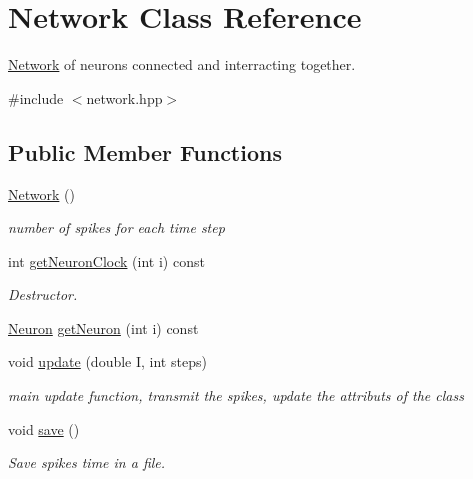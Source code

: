 \hypertarget{classNetwork}{\section{Network Class Reference}
\label{classNetwork}
}


\hyperlink{classNetwork}{Network} of neurons connected and interracting together.  




{\ttfamily \#include $<$network.\-hpp$>$}

\subsection*{Public Member Functions}
\begin{DoxyCompactItemize}
\item 
\hyperlink{classNetwork_a3cc2fb4f8fa4d507077e8da85ce5a1c8}{Network} ()
\begin{DoxyCompactList}\small\item\em number of spikes for each time step \end{DoxyCompactList}\item 
int \hyperlink{classNetwork_ad6a09c57e50ed597ba9d5579b3c60d81}{get\-Neuron\-Clock} (int i) const 
\begin{DoxyCompactList}\small\item\em Destructor. \end{DoxyCompactList}\item 
\hyperlink{classNeuron}{Neuron} \hyperlink{classNetwork_a73d0f5b66c50053dee883c0a0bda1ab7}{get\-Neuron} (int i) const 
\item 
void \hyperlink{classNetwork_a20f30cc6bb4d205b7b8ea747f2a5f706}{update} (double I, int steps)
\begin{DoxyCompactList}\small\item\em main update function, transmit the spikes, update the attributs of the class \end{DoxyCompactList}\item 
\hypertarget{classNetwork_a46d71ec917bea6dbf37ba72415795b58}{void \hyperlink{classNetwork_a46d71ec917bea6dbf37ba72415795b58}{save} ()}\label{classNetwork_a46d71ec917bea6dbf37ba72415795b58}

\begin{DoxyCompactList}\small\item\em Save spikes time in a file. \end{DoxyCompactList}\end{DoxyCompactItemize}


